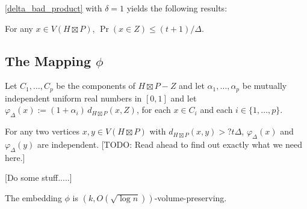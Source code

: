 \documentclass{patmorin}
\begin{document}
\cref{delta_bad_product} with $\delta=1$ yields the following results:

\begin{cor}
  For any $x\in V(H\boxtimes P)$, $\Pr(x\in Z)\le (t+1)/\Delta$.
\end{cor}

\subsection{\boldmath The Mapping $\phi$}

Let $C_1,\ldots,C_p$ be the components of $H\boxtimes P-Z$ and let $\alpha_1,\ldots,\alpha_p$ be mutually independent uniform real numbers in $[0,1]$ and let $\varphi_\Delta(x):=(1+\alpha_i)\,d_{H\boxtimes P}(x,Z)$, for each $x\in C_i$ and each $i\in\{1,\ldots,p\}$.

\begin{lem}
  For any two vertices $x,y\in V(H\boxtimes P)$ with $d_{H\boxtimes P}(x,y)>?t\Delta$, $\varphi_\Delta(x)$ and $\varphi_\Delta(y)$ are independent.   [TODO: Read ahead to find out exactly what we need here.]
\end{lem}


[Do some stuff.....]

\begin{thm}
  The embedding $\phi$ is $(k,O(\sqrt{\log n}))$-volume-preserving.
\end{thm}
\end{document}
